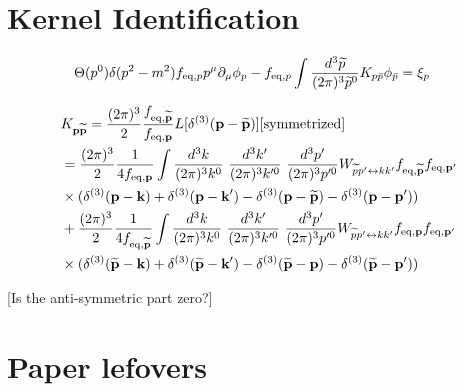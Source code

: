\documentclass[aps,prd,preprint,nofootinbib,amsmath,amssymb,showpacs,longbibliography,singlecolumn,superscriptaddress,10pt]{revtex4-1}
\theoremstyle{plain}
\theoremstyle{definition}
\begin{document}
\section{Kernel Identification} 
%

\begin{equation}
\begin{aligned}
&
\Theta(p^{0})\delta(p^{2}-m^{2})f_{\text{eq},p}p^\mu \partial_\mu \phi_p 
-
f_{\text{eq},p} \int \dfrac{d^3 \widetilde{p}}{(2\pi)^3 \widetilde{p}^0} K_{p\Bar{p}} \phi_{\Bar{p}} = \xi_p
\end{aligned}    
\end{equation}

\begin{equation}
\begin{aligned}
&
K_{{\bf p} \widetilde{\textbf{p}}} = \frac{(2 \pi)^{3}}{2}  
\frac{f_{\mathrm{eq},\widetilde{\textbf{p}}}}{f_{\mathrm{eq}, {\bf p}}}
L[\delta^{(3)}(\textbf{p} - \widetilde{\textbf{p}}) ] [\text{symmetrized}]
\\
&
=
\frac{(2 \pi)^{3}}{2} 
\frac{1}{4 f_{\mathrm{eq}, {\bf p}}} \int 
\frac{d^{3}k}{(2 \pi)^{3} k^{0}} \ \frac{d^{3}k'}{(2 \pi)^{3} k'^{0}} \ \frac{d^{3}p'}{(2 \pi)^{3} p'^{0}}
W_{\widetilde{p}p' \leftrightarrow kk'} f_{\mathrm{eq},\widetilde{\textbf{p}}} f_{\mathrm{eq},\textbf{p}'} 
\\
&
\times (  \delta^{(3)}(\textbf{p} - \textbf{k}) + \delta^{(3)}(\textbf{p} - \textbf{k}') - \delta^{(3)}(\textbf{p} - \widetilde{\textbf{p}}) - \delta^{(3)}(\textbf{p} - \textbf{p}')  )  
\\
&
+
\frac{(2 \pi)^{3}}{2} 
\frac{1}{4 f_{\mathrm{eq}, \widetilde{\bf p}}} \int 
\frac{d^{3}k}{(2 \pi)^{3} k^{0}} \ \frac{d^{3}k'}{(2 \pi)^{3} k'^{0}} \ \frac{d^{3}p'}{(2 \pi)^{3} p'^{0}}
W_{\widetilde{p}p' \leftrightarrow kk'} f_{\mathrm{eq},\textbf{p}} f_{\mathrm{eq},\textbf{p}'} 
\\
&
\times (  \delta^{(3)}(\widetilde{\textbf{p}} - \textbf{k}) + \delta^{(3)}(\widetilde{\textbf{p}} - \textbf{k}') - \delta^{(3)}(\widetilde{\textbf{p}} - \textbf{p}) - \delta^{(3)}(\widetilde{\textbf{p}} - \textbf{p}')  )  
\end{aligned}    
\end{equation}


[Is the anti-symmetric part zero?]

\section{Paper lefovers}
\end{document}
